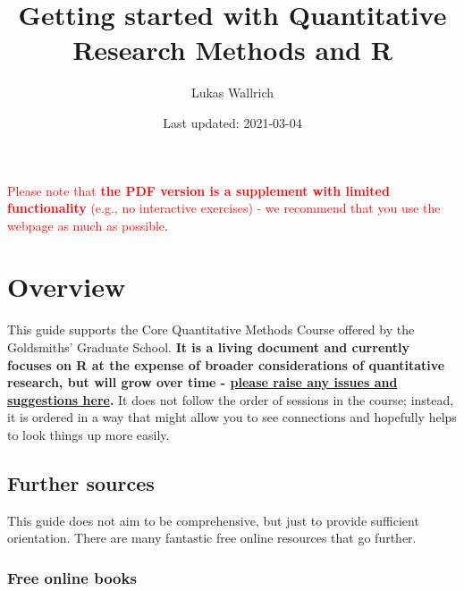 \documentclass[
]{book}
\title{Getting started with Quantitative Research Methods and R}
\author{Lukas Wallrich}
\date{Last updated: 2021-03-04}
\begin{document}
\maketitle

{
\hypersetup{linkcolor=}
\setcounter{tocdepth}{1}
\tableofcontents
}
\newpage

\textcolor{red}{Please note that \textbf{the PDF version is a supplement with limited functionality} (e.g., no interactive exercises) - we recommend that you use the webpage as much as possible}.

\hypertarget{overview}{%
\chapter*{Overview}\label{overview}}

This guide supports the Core Quantitative Methods Course offered by the Goldsmiths' Graduate School. \textbf{It is a living document and currently focuses on R at the expense of broader considerations of quantitative research, but will grow over time - \href{https://github.com/LukasWallrich/GoldCoreQuants/issues}{please raise any issues and suggestions here}.} It does not follow the order of sessions in the course; instead, it is ordered in a way that might allow you to see connections and hopefully helps to look things up more easily.

\hypertarget{further-sources}{%
\section{Further sources}\label{further-sources}}

This guide does not aim to be comprehensive, but just to provide sufficient orientation. There are many fantastic free online resources that go further.

\hypertarget{free-online-books}{%
\subsection{Free online books}\label{free-online-books}}
\end{document}
